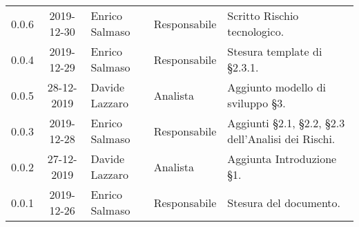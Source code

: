 {\begin{longtable}{ c c  C{4cm}  C{3cm} C{4cm}}
0.0.6 & 2019-12-30 & Enrico Salmaso & Responsabile & Scritto Rischio tecnologico. \\
0.0.4 & 2019-12-29 & Enrico Salmaso & Responsabile & Stesura template di §2.3.1.\\
0.0.5 & 28-12-2019 & Davide Lazzaro & Analista & Aggiunto modello di sviluppo §3.\\
0.0.3 & 2019-12-28 & Enrico Salmaso & Responsabile & Aggiunti §2.1, §2.2, §2.3 dell'Analisi dei Rischi. \\
0.0.2 & 27-12-2019 & Davide Lazzaro & Analista & Aggiunta Introduzione §1. \\
0.0.1 & 2019-12-26 & Enrico Salmaso & Responsabile & Stesura del documento.  \\
		
\end{longtable}
}